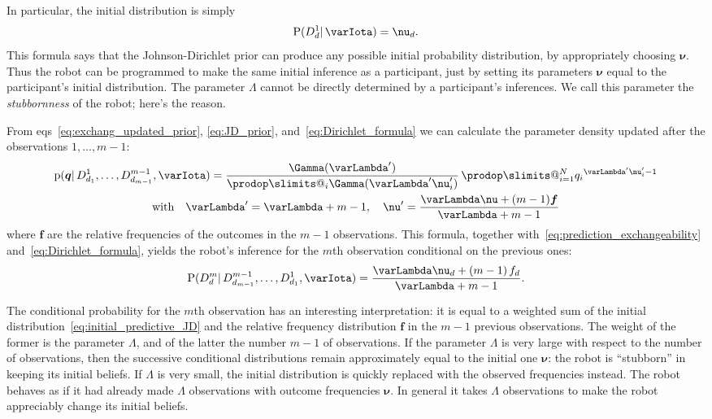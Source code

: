 \documentclass[\ifafour a4paper,12pt,\else a5paper,10pt,\fi%
onecolumn,oneside,article,%
british%
]{memoir}
\makeatletter
\theoremstyle{remark}
\theoremstyle{innote}
\def\prod{\DOTSI\prodop\slimits@}
\newcommand*{\pf}{\mathrm{p}}%
\newcommand*{\p}{\mathrm{P}}%
\renewcommand*{\|}{\mathpunct{|}}
\newcommand*{\eqns}{eqs}%
\newcommand*{\yqq}{q}
\newcommand*{\yq}{\bm{\yqq}}
\newcommand*{\yff}{f}
\newcommand*{\yf}{\bm{\yff}}
\newcommand*{\yI}{\varIota}
\newcommand*{\yMJ}{\yI}
\newcommand*{\yN}{\varLambda}
\newcommand*{\ynn}{\nu}
\newcommand*{\yn}{\bm{\nu}}
\makeatother
\begin{document}
In particular, the initial distribution is simply
\begin{equation}
  \label{eq:initial_predictive_JD}
  \p(D^1_{d} \| \yMJ)  = \ynn_d.
\end{equation}
This formula says that the Johnson-Dirichlet prior can produce any possible
initial probability distribution, by appropriately choosing $\yn$. Thus the
robot can be programmed to make the same initial inference as a
participant, just by setting its parameters $\yn$ equal to the
participant's initial distribution. The parameter $\yN$ cannot be directly
determined by a participant's inferences. We call this parameter the
\emph{stubbornness} of the robot; here's the reason.

From \eqns~\eqref{eq:exchang_updated_prior}, \eqref{eq:JD_prior},
and~\eqref{eq:Dirichlet_formula} we can calculate the parameter density
updated after the observations $1,\dotsc,m-1$:
\begin{multline}
  \label{eq:update_prior_JD}
  \pf(\yq \| D^1_{d_1}, \dotsc, D^{m-1}_{d_{m-1}}, \yMJ)
  = 
  \frac{\Gamma(\yN')}{\prod_i \Gamma(\yN'\ynn_i')}\,
  \prod_{i=1}^{N}{\yqq_i}^{\yN'\ynn_i'-1}
  \\
  \text{with}\quad \yN' =\yN+m-1,\quad
  \yn'=\frac{\yN\yn+(m-1)\yf}{\yN+m-1}
\end{multline}
where $\yf$ are the relative frequencies of the outcomes in the $m-1$
observations. This formula, together
with~\eqref{eq:prediction_exchangeability} and~\eqref{eq:Dirichlet_formula},
yields the robot's inference for the $m$th observation conditional on the
previous ones:
\begin{equation}
  \label{eq:predictive_JD_general}
  \p(D^{m}_{d} \| D^{m-1}_{d_{m-1}},\dotsc,D^1_{d_1}, \yMJ) =
\frac{\yN\ynn_d + (m-1)\,\yff_d}{\yN+m-1}.
\end{equation}

The conditional probability for the $m$th observation has an interesting
interpretation: it is equal to a weighted sum of the initial
distribution~\eqref{eq:initial_predictive_JD} and the relative frequency
distribution $\yf$ in the $m-1$ previous observations. The weight of the
former is the parameter $\yN$, and of the latter the number $m-1$ of
observations. If the parameter $\yN$ is very large with respect to the
number of observations, then the successive conditional distributions
remain approximately equal to the initial one $\yn$: the robot is
\enquote{stubborn} in keeping its initial beliefs. If $\yN$ is very small,
the initial distribution is quickly replaced with the observed frequencies
instead. The robot behaves as if it had already made $\yN$ observations
with outcome frequencies $\yn$. In general it takes $\yN$ observations to
make the robot appreciably change its initial beliefs.
\end{document}
